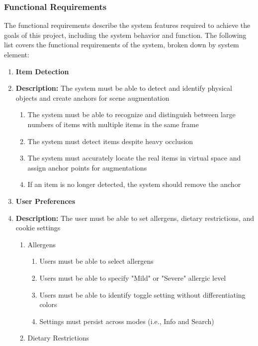 \documentclass[thesis]{fputhesis}
\begin{document}
\begin{body}
\subsubsection{Functional Requirements}
The functional requirements describe the system features required to achieve the goals of this project, including the system behavior and function. The following list covers the functional requirements of the system, broken down by system element:
\filbreak
\begin{enumerate}
    \item \textbf{Item Detection}
    \item[] \textbf{Description:}  The system must be able to detect and identify physical objects and create anchors for scene augmentation
    \begin{enumerate}
        \item[\textbullet] The system must be able to recognize and distinguish between large numbers of items with multiple items in the same frame
        \item[\textbullet] The system must detect items despite heavy occlusion
        \item[\textbullet] The system must accurately locate the real items in virtual space and assign anchor points for augmentations
        \item[\textbullet] If an item is no longer detected, the system should remove the anchor
    \end{enumerate}
    \item \textbf{User Preferences}
    \item[] \textbf{Description:} The user must be able to set allergens, dietary restrictions, and cookie settings
    \begin{enumerate}
        \item[\textbullet] Allergens
        \begin{enumerate}
            \item[\textbullet] Users must be able to select allergens
            \item[\textbullet] Users must be able to specify "Mild" or "Severe" allergic level
            \item[\textbullet] Users must be able to identify toggle setting without differentiating colors
            \item[\textbullet] Settings must persist across modes (i.e., Info and Search)
        \end{enumerate}
        \item[\textbullet] Dietary Restrictions

\end{enumerate}
\end{enumerate}
\end{body}
\end{document}
